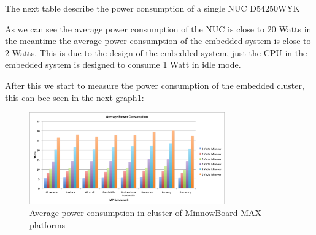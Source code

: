 The next table describe the power consumption of a single NUC D54250WYK


\begin{table}[]
    \centering
    \caption{Power consumption of NUC D54250WYK with MPI benchmarking}
    \label{NUC_power_1}
\end{table}


As we can see the average power consumption of the NUC is close to 20 Watts in
the meantime the average power consumption of the embedded system is close to
2 Watts. This is due to the design of the embedded system, just the CPU in the
embedded system is designed to consume 1 Watt in idle mode.

After this we start to measure the power consumption of the embedded cluster,
this can bee seen in the next graph\ref{power_average_minnow}: 

\begin{figure}[H]
\centering
\includegraphics[width=0.75\textwidth]{images/power_average.png}
\caption{Average power consumption in cluster of MinnowBoard MAX platforms}
\label{power_average_minnow}
\end{figure}


